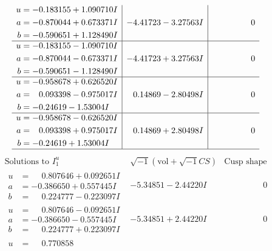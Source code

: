 \documentclass[1p]{elsarticle_modified}
\theoremstyle{definition}
\newcommand{\I}{\sqrt{-1}}
\begin{document}
$$\begin{array}{c|c|c}
\begin{aligned}
u &= -0.183155 + 1.090710 I \\
a &= -0.870044 + 0.673371 I \\
b &= -0.590651 + 1.128490 I\end{aligned}
 & -4.41723 - 3.27563 I & \phantom{-0.000000 } 0 \\ \hline\begin{aligned}
u &= -0.183155 - 1.090710 I \\
a &= -0.870044 - 0.673371 I \\
b &= -0.590651 - 1.128490 I\end{aligned}
 & -4.41723 + 3.27563 I & \phantom{-0.000000 } 0 \\ \hline\begin{aligned}
u &= -0.958678 + 0.626520 I \\
a &= \phantom{-}0.093398 - 0.975017 I \\
b &= -0.24619 - 1.53004 I\end{aligned}
 & \phantom{-}0.14869 - 2.80498 I & \phantom{-0.000000 } 0 \\ \hline\begin{aligned}
u &= -0.958678 - 0.626520 I \\
a &= \phantom{-}0.093398 + 0.975017 I \\
b &= -0.24619 + 1.53004 I\end{aligned}
 & \phantom{-}0.14869 + 2.80498 I & \phantom{-0.000000 } 0\\
 \hline 
 \end{array}$$\newpage$$\begin{array}{c|c|c}  
\text{Solutions to }I^u_{1}& \I (\text{vol} + \sqrt{-1}CS) & \text{Cusp shape}\\
 \hline 
\begin{aligned}
u &= \phantom{-}0.807646 + 0.092651 I \\
a &= -0.386650 + 0.557445 I \\
b &= \phantom{-}0.224777 - 0.223097 I\end{aligned}
 & -5.34851 - 2.44220 I & \phantom{-0.000000 } 0 \\ \hline\begin{aligned}
u &= \phantom{-}0.807646 - 0.092651 I \\
a &= -0.386650 - 0.557445 I \\
b &= \phantom{-}0.224777 + 0.223097 I\end{aligned}
 & -5.34851 + 2.44220 I & \phantom{-0.000000 } 0 \\ \hline\begin{aligned}
u &= \phantom{-}0.770858\phantom{ +0.000000I} \\

\end{aligned}
\end{array}$$
\end{document}
